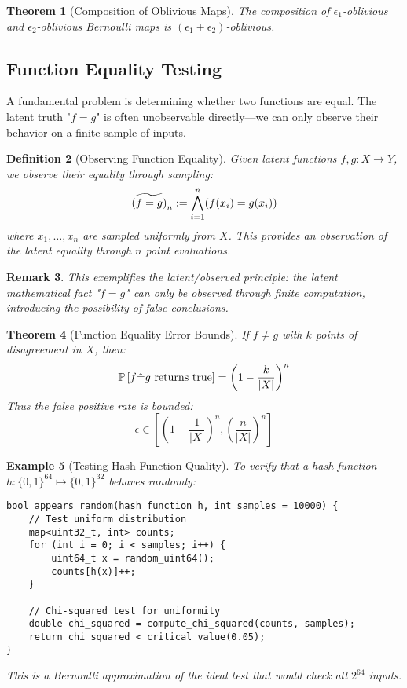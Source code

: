 \documentclass[11pt,final,hidelinks]{article}
\newtheorem{theorem}{Theorem}[section]
\newtheorem{definition}[theorem]{Definition}
\newtheorem{example}[theorem]{Example}
\newtheorem{remark}[theorem]{Remark}
\newcommand{\Set}[1]{#1}              %
\begin{document}
\begin{theorem}[Composition of Oblivious Maps]
The composition of $\epsilon_1$-oblivious and $\epsilon_2$-oblivious Bernoulli maps is $(\epsilon_1 + \epsilon_2)$-oblivious.
\end{theorem}

\subsection{Function Equality Testing}

A fundamental problem is determining whether two functions are equal. The latent truth "$f = g$" is often unobservable directly—we can only observe their behavior on a finite sample of inputs.

\begin{definition}[Observing Function Equality]
Given latent functions $f, g : X \to Y$, we observe their equality through sampling:
\begin{equation}
\widetilde{(f = g)}_n := \bigwedge_{i=1}^n (f(x_i) = g(x_i))
\end{equation}
where $x_1, \ldots, x_n$ are sampled uniformly from $X$. This provides an observation of the latent equality through $n$ point evaluations.
\end{definition}

\begin{remark}
This exemplifies the latent/observed principle: the latent mathematical fact "$f = g$" can only be observed through finite computation, introducing the possibility of false conclusions.
\end{remark}

\begin{theorem}[Function Equality Error Bounds]
If $f \neq g$ with $k$ points of disagreement in $\Set{X}$, then:
\begin{equation}
\Prob{f \hat{=} g \text{ returns true}} = \left(1 - \frac{k}{|\Set{X}|}\right)^n
\end{equation}
Thus the false positive rate is bounded:
\begin{equation}
\epsilon \in \left[\left(1 - \frac{1}{|\Set{X}|}\right)^n, \left(\frac{n}{|\Set{X}|}\right)^n\right]
\end{equation}
\end{theorem}

\begin{example}[Testing Hash Function Quality]
To verify that a hash function $h : \{0,1\}^{64} \mapsto \{0,1\}^{32}$ behaves randomly:
\begin{verbatim}
bool appears_random(hash_function h, int samples = 10000) {
    // Test uniform distribution
    map<uint32_t, int> counts;
    for (int i = 0; i < samples; i++) {
        uint64_t x = random_uint64();
        counts[h(x)]++;
    }
    
    // Chi-squared test for uniformity
    double chi_squared = compute_chi_squared(counts, samples);
    return chi_squared < critical_value(0.05);
}
\end{verbatim}

This is a Bernoulli approximation of the ideal test that would check all $2^{64}$ inputs.
\end{example}
\end{document}
